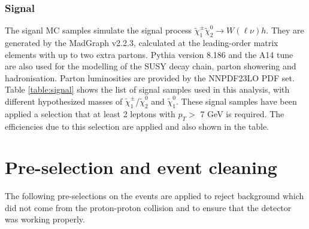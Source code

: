 \subsubsection{Signal}
The siganl MC samples simulate the signal process $\tilde{\chi}_1^\pm \tilde{\chi}_2^0 \rightarrow W(\ell\nu)h$.
They are generated by the {\sc MadGraph} v2.2.3, calculated at the leading-order matrix elements with up to two extra partons.
{\sc Pythia} version 8.186 and the A14 tune are also used for the modelling of the SUSY decay chain, parton showering and hadronisation.
Parton luminosities are provided by the NNPDF23LO PDF set.
Table \ref{table:signal} shows the list of signal samples used in this analysis, with different hypothesized masses of $\tilde{\chi}^{\pm}_{1}$/$\tilde{\chi}^{0}_{2}$ and $\tilde{\chi}^{0}_{1}$.
These signal samples have been applied a selection that at least 2 leptons with $p_{T} >$ 7 GeV is required.
The efficiencies due to this selection are applied and also shown in the table.

\section{Pre-selection and event cleaning}
The following pre-selections on the events are applied to reject background which did not come from the proton-proton collision and to ensure that the detector was working properly.

